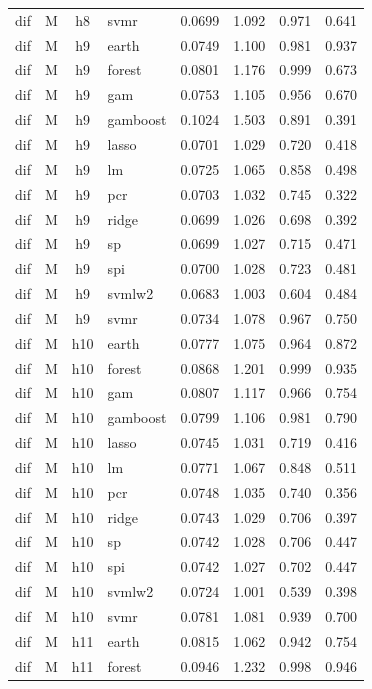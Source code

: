 \begin{ThreePartTable}
\begin{longtable}[t]{llclcccc}
dif & M & h8 & svmr & 0.0699 & 1.092 & 0.971 & 0.641\\
\addlinespace
dif & M & h9 & earth & 0.0749 & 1.100 & 0.981 & 0.937\\
dif & M & h9 & forest & 0.0801 & 1.176 & 0.999 & 0.673\\
dif & M & h9 & gam & 0.0753 & 1.105 & 0.956 & 0.670\\
dif & M & h9 & gamboost & 0.1024 & 1.503 & 0.891 & 0.391\\
dif & M & h9 & lasso & 0.0701 & 1.029 & 0.720 & 0.418\\
dif & M & h9 & lm & 0.0725 & 1.065 & 0.858 & 0.498\\
dif & M & h9 & pcr & 0.0703 & 1.032 & 0.745 & 0.322\\
dif & M & h9 & ridge & 0.0699 & 1.026 & 0.698 & 0.392\\
dif & M & h9 & sp & 0.0699 & 1.027 & 0.715 & 0.471\\
dif & M & h9 & spi & 0.0700 & 1.028 & 0.723 & 0.481\\
dif & M & h9 & svmlw2 & 0.0683 & 1.003 & 0.604 & 0.484\\
dif & M & h9 & svmr & 0.0734 & 1.078 & 0.967 & 0.750\\
\addlinespace
dif & M & h10 & earth & 0.0777 & 1.075 & 0.964 & 0.872\\
dif & M & h10 & forest & 0.0868 & 1.201 & 0.999 & 0.935\\
dif & M & h10 & gam & 0.0807 & 1.117 & 0.966 & 0.754\\
dif & M & h10 & gamboost & 0.0799 & 1.106 & 0.981 & 0.790\\
dif & M & h10 & lasso & 0.0745 & 1.031 & 0.719 & 0.416\\
dif & M & h10 & lm & 0.0771 & 1.067 & 0.848 & 0.511\\
dif & M & h10 & pcr & 0.0748 & 1.035 & 0.740 & 0.356\\
dif & M & h10 & ridge & 0.0743 & 1.029 & 0.706 & 0.397\\
dif & M & h10 & sp & 0.0742 & 1.028 & 0.706 & 0.447\\
dif & M & h10 & spi & 0.0742 & 1.027 & 0.702 & 0.447\\
dif & M & h10 & svmlw2 & 0.0724 & 1.001 & 0.539 & 0.398\\
dif & M & h10 & svmr & 0.0781 & 1.081 & 0.939 & 0.700\\
\addlinespace
dif & M & h11 & earth & 0.0815 & 1.062 & 0.942 & 0.754\\
dif & M & h11 & forest & 0.0946 & 1.232 & 0.998 & 0.946\\

\end{longtable}
\end{ThreePartTable}
